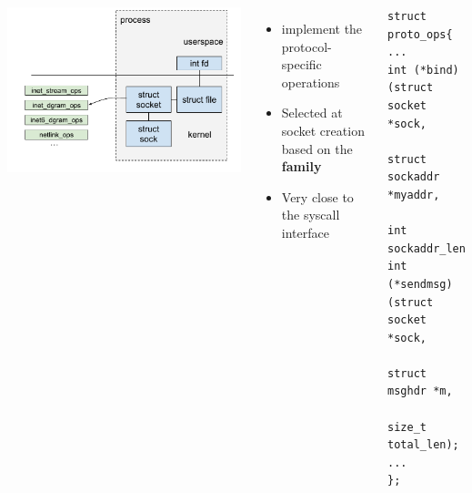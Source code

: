 \begin{frame}[fragile]{}
	\begin{columns}
			\includegraphics[width=\textwidth]{slides/networking-socket/socket_proto_ops.pdf}
		\begin{itemize}
			\item {} implement the protocol-specific operations
			\item Selected at socket creation based on the \textbf{family}
			\item Very close to the syscall interface
		\end{itemize}
		\begin{verbatim}
struct proto_ops{
...
int (*bind) (struct socket *sock,
             struct sockaddr *myaddr,
             int sockaddr_len);
int (*sendmsg) (struct socket *sock,
                struct msghdr *m,
                size_t total_len);
...
};
		\end{verbatim}
	\end{columns}
\end{frame}

